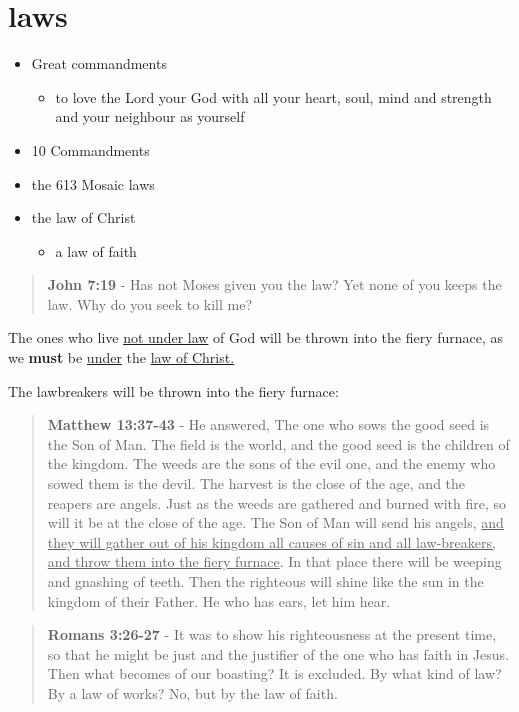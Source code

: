 \documentclass[11pt]{article}
\begin{document}
\section{laws}
\label{sec:orgc029edd}
\begin{itemize}
\item Great commandments
\begin{itemize}
\item to love the Lord your God with all your heart, soul, mind and strength and your neighbour as yourself
\end{itemize}
\item 10 Commandments
\item the 613 Mosaic laws
\item the law of Christ
\begin{itemize}
\item a law of faith
\end{itemize}
\end{itemize}

\begin{quote}
\textbf{John 7:19} - Has not Moses given you the law? Yet none of you keeps the law. Why do you seek to kill me?
\end{quote}

The ones who live \uline{not under law} of God will be thrown into the fiery furnace, as we \textbf{must} be \uline{under} the \uline{law of Christ.}

The lawbreakers will be thrown into the fiery furnace:

\begin{quote}
\textbf{Matthew 13:37-43} - He answered, The one who sows the good seed is the Son of Man. The field is the world, and the good seed is the children of the kingdom. The weeds are the sons of the evil one, and the enemy who sowed them is the devil. The harvest is the close of the age, and the reapers are angels. Just as the weeds are gathered and burned with fire, so will it be at the close of the age. The Son of Man will send his angels, \uline{and they will gather out of his kingdom all causes of sin and all law-breakers, and throw them into the fiery furnace}. In that place there will be weeping and gnashing of teeth. Then the righteous will shine like the sun in the kingdom of their Father. He who has ears, let him hear.
\end{quote}

\begin{quote}
\textbf{Romans 3:26-27} - It was to show his righteousness at the present time, so that he might be just and the justifier of the one who has faith in Jesus. Then what becomes of our boasting? It is excluded. By what kind of law? By a law of works? No, but by the law of faith.
\end{quote}
\end{document}
